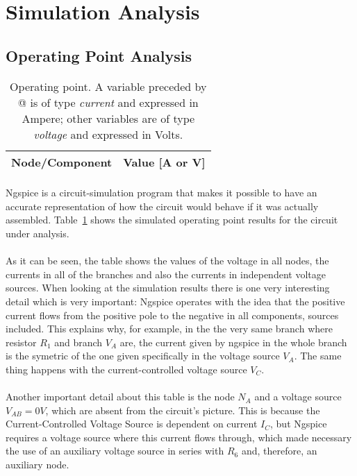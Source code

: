 \section{Simulation Analysis}
\label{sec:simulation}

\subsection{Operating Point Analysis}
\label{subsec:opa}

\begin{table}[h] \centering
  \begin{tabular}{|l|r|}
    \hline    
    {\bf Node/Component} & {\bf Value [A or V]} \\ \hline
    
  \end{tabular}
  \caption{Operating point. A variable preceded by @ is of type {\em current}
    and expressed in Ampere; other variables are of type {\it voltage} and expressed in
    Volts.}
  \label{tab:op}
\end{table}



\paragraph{}Ngspice is a circuit-simulation program that makes it possible to have an accurate representation of how the circuit would behave if it was actually assembled. Table~\ref{tab:op} shows the simulated operating point results for the circuit
under analysis.


\paragraph{}As it can be seen, the table shows the values of the voltage in all nodes, the currents in all of the branches and also the currents in independent voltage sources. When looking at the simulation results there is one very interesting detail which is very important: Ngspice operates with the idea that the positive current flows from the positive pole to the negative in all components, sources included. This explains why, for example, in the the very same branch where resistor $R_1$ and branch $V_A$ are, the current given by ngspice in the whole branch is the symetric of the one given specifically in the voltage source $V_A$. The same thing happens with the current-controlled voltage source $V_C$.
\paragraph{} Another important detail about this table is the node $N_A$ and a voltage source $V_{AB} = 0 V$, which are absent from the circuit's picture. This is because the Current-Controlled Voltage Source is dependent on current $I_C$, but Ngspice requires a voltage source where this current flows through, which made necessary the use of an auxiliary voltage source in series with $R_6$ and, therefore, an auxiliary node.  



